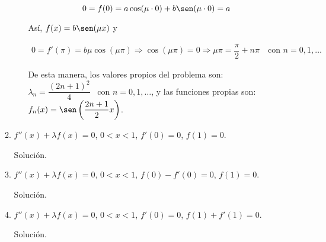 \documentclass[fleqn]{article}
\begin{document}
\begin{enumerate}[I.]
\begin{enumerate}
\begin{enumerate}[i)]
				\begin{equation*}
					0 = f(0) = a \cos(\mu \cdot 0) + b \sen(\mu \cdot 0) = a
				\end{equation*}

				Así, $ f(x) = b \sen(\mu x) $ y 

				\begin{align*}
					0 = f'(\pi) = b \mu \cos(\mu \pi) \Longrightarrow \cos(\mu \pi) = 0 \Longrightarrow \mu \pi = \dfrac{\pi}{2} + n \pi \quad \mbox{con } n = 0, 1, \ldots
				\end{align*}
				
				De esta manera, los valores propios del problema son: $ \lambda_n = \dfrac{(2n + 1)^2}{4} $ \, con $ n = 0, 1, \ldots $, y las funciones propias son: $ f_n (x) = \sen \left( \dfrac{2n + 1}{2} x \right) $.
			\end{enumerate}


			\bfseries
			
			\item $ f''(x) + \lambda f(x) = 0 $, $ 0 < x < 1 $, $ f'(0) = 0 $, $ f(1) = 0 $.
			
			Solución.
			
			\normalfont




			\bfseries
			
			\item $ f''(x) + \lambda f(x) = 0 $, $ 0 < x < 1 $, $ f(0) - f'(0) = 0 $, $ f(1) = 0 $.
			
			Solución.
			
			\normalfont




			\bfseries
			
			\item $ f''(x) + \lambda f(x) = 0 $, $ 0 < x < 1 $, $ f'(0) = 0 $, $ f(1) + f'(1) = 0 $.
			
			Solución.
			
			\normalfont


			
		\end{enumerate}


\end{enumerate}
\end{document}
